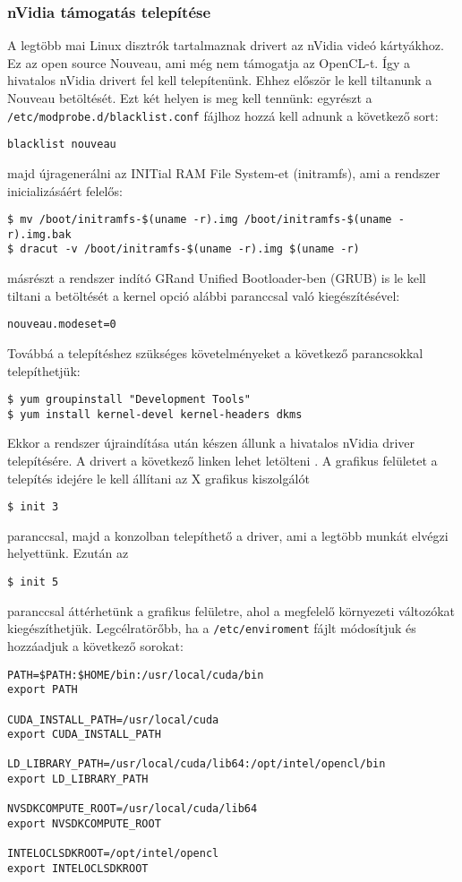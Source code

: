 \subsubsection*{nVidia támogatás telepítése}
	A legtöbb mai Linux disztrók tartalmaznak drivert az nVidia videó kártyákhoz.
	Ez az open source Nouveau, ami még nem támogatja az OpenCL-t.
	Így a hivatalos nVidia drivert fel kell telepítenünk.
	Ehhez először le kell tiltanunk a Nouveau betöltését.
	Ezt két helyen is meg kell tennünk: 
	egyrészt a \texttt{/etc/modprobe.d/blacklist.conf} fájlhoz hozzá kell adnunk a
	következő sort:
\begin{lstlisting}
blacklist nouveau
\end{lstlisting}
	majd újragenerálni az INITial RAM File System-et (initramfs), ami a rendszer
	inicializásáért felelős:
\begin{lstlisting}
$ mv /boot/initramfs-$(uname -r).img /boot/initramfs-$(uname -r).img.bak
$ dracut -v /boot/initramfs-$(uname -r).img $(uname -r)
\end{lstlisting}
	másrészt a rendszer indító GRand Unified Bootloader-ben (GRUB) is le kell
	tiltani a betöltését a kernel opció alábbi paranccsal való kiegészítésével:
\begin{lstlisting}
nouveau.modeset=0
\end{lstlisting}
	Továbbá a telepítéshez szükséges követelményeket a következő parancsokkal telepíthetjük:
\begin{lstlisting}
$ yum groupinstall "Development Tools"
$ yum install kernel-devel kernel-headers dkms
\end{lstlisting}
	Ekkor a rendszer újraindítása után készen állunk a hivatalos nVidia driver
	telepítésére. A drivert a következő linken lehet letölteni \cite{nvidia-driver}.
	A grafikus felületet a telepítés idejére le kell állítani az X grafikus
	kiszolgálót
\begin{lstlisting}
$ init 3
\end{lstlisting}
	paranccsal, majd a konzolban telepíthető a driver, ami a legtöbb munkát elvégzi helyettünk. Ezután az
\begin{lstlisting}
$ init 5
\end{lstlisting}
	paranccsal áttérhetünk a grafikus felületre, ahol a megfelelő környezeti változókat kiegészíthetjük.
	Legcélratörőbb, ha a \texttt{/etc/enviroment} fájlt módosítjuk és hozzáadjuk
	a következő sorokat:
\begin{lstlisting}
PATH=$PATH:$HOME/bin:/usr/local/cuda/bin
export PATH

CUDA_INSTALL_PATH=/usr/local/cuda
export CUDA_INSTALL_PATH

LD_LIBRARY_PATH=/usr/local/cuda/lib64:/opt/intel/opencl/bin
export LD_LIBRARY_PATH

NVSDKCOMPUTE_ROOT=/usr/local/cuda/lib64
export NVSDKCOMPUTE_ROOT

INTELOCLSDKROOT=/opt/intel/opencl
export INTELOCLSDKROOT
\end{lstlisting}
